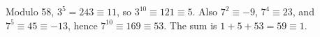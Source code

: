 Modulo 58, $3^5=243\equiv11$, so $3^{10}\equiv121\equiv5$. Also $7^2\equiv-9$, $7^4\equiv23$, and $7^5\equiv45\equiv-13$, hence $7^{10}\equiv169\equiv53$. The sum is $1+5+53=59\equiv\boxed1$.

